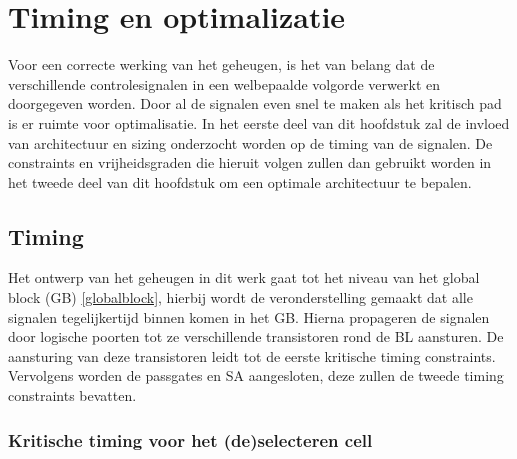 \chapter{Timing en optimalizatie}
\label{timing-optimization}
Voor een correcte werking van het geheugen, is het van belang dat de verschillende controlesignalen in een welbepaalde volgorde verwerkt en doorgegeven worden.
Door al de signalen even snel te maken als het kritisch pad is er ruimte voor optimalisatie. In het eerste deel van dit hoofdstuk zal de invloed van architectuur en sizing onderzocht worden op de timing van de signalen. De constraints en vrijheidsgraden die hieruit volgen zullen dan gebruikt worden in het tweede deel van dit hoofdstuk om een optimale architectuur te bepalen.

\section{Timing}
\label{timing}
Het ontwerp van het geheugen in dit werk gaat tot het niveau van het global block (GB) \ref{globalblock}, hierbij wordt de veronderstelling gemaakt dat alle signalen tegelijkertijd binnen komen in het GB. Hierna propageren de signalen door logische poorten tot ze verschillende transistoren rond de BL aansturen. De aansturing van deze transistoren leidt tot de eerste kritische timing constraints. Vervolgens worden de passgates en SA aangesloten, deze zullen de tweede timing constraints bevatten.

\subsection{Kritische timing voor het (de)selecteren cell}
\label{optimization}

